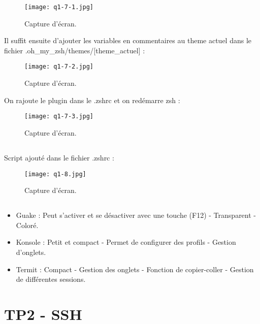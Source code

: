 \documentclass{article}
\begin{document}
\begin{figure}[h]
\centering
\texttt{[image: q1-7-1.jpg]}
\caption{\label{fig:frog}Capture d'écran.}
\end{figure}

Il suffit ensuite d’ajouter les variables en commentaires au theme actuel dans le fichier
.oh\_my\_zsh/themes/[theme\_actuel] :

\begin{figure}[h]
\centering
\texttt{[image: q1-7-2.jpg]}
\caption{\label{fig:frog}Capture d'écran.}
\end{figure}

On rajoute le plugin dans le .zshrc et on redémarre zsh :

\begin{figure}[h]
\centering
\texttt{[image: q1-7-3.jpg]}
\caption{\label{fig:frog}Capture d'écran.}
\end{figure}

\subsection{}

Script ajouté dans le fichier .zshrc :

\begin{figure}[h]
\centering
\texttt{[image: q1-8.jpg]}
\caption{\label{fig:frog}Capture d'écran.}
\end{figure}

\subsection{}

\begin{itemize}
    \item Guake :
Peut s’activer et se désactiver avec une touche (F12) -
Transparent -
Coloré.
\item Konsole :
Petit et compact -
Permet de configurer des profils -
Gestion d'onglets.
\item Termit :
Compact -
Gestion des onglets -
Fonction de copier-coller -
Gestion de différentes sessions.
\end{itemize}

\section{TP2 - SSH}

\subsection{}
\end{document}
